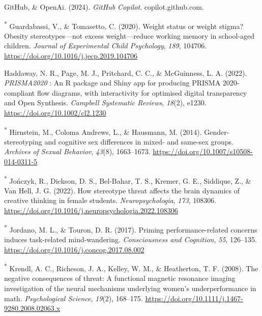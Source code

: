 \documentclass[
  stu,floatsintext]{apa7}
\newlength{\cslhangindent}
\newenvironment{CSLReferences}[2] %
 {\begin{list}{}{%
  \setlength{\itemindent}{0pt}
  \setlength{\leftmargin}{0pt}
  \setlength{\parsep}{0pt}
  \ifodd #1
   \setlength{\leftmargin}{\cslhangindent}
   \setlength{\itemindent}{-1\cslhangindent}
  \fi
  \setlength{\itemsep}{#2\baselineskip}}}
 {\end{list}}
\begin{document}
\begin{CSLReferences}{1}{0}
GitHub, \& OpenAi. (2024). \emph{{GitHub Copilot}}. copilot.github.com.

\textsuperscript{*} Guardabassi, V., \& Tomasetto, C. (2020). Weight status or weight stigma? {Obesity} stereotypes---not excess weight---reduce working memory in school-aged children. \emph{Journal of Experimental Child Psychology}, \emph{189}, 104706. \url{https://doi.org/10.1016/j.jecp.2019.104706}

Haddaway, N. R., Page, M. J., Pritchard, C. C., \& McGuinness, L. A. (2022). {\emph{PRISMA2020}} : {An R} package and {Shiny} app for producing {PRISMA} 2020-compliant flow diagrams, with interactivity for optimised digital transparency and {Open Synthesis}. \emph{Campbell Systematic Reviews}, \emph{18}(2), e1230. \url{https://doi.org/10.1002/cl2.1230}

\textsuperscript{*} Hirnstein, M., Coloma Andrews, L., \& Hausmann, M. (2014). Gender-stereotyping and cognitive sex differences in mixed- and same-sex groups. \emph{Archives of Sexual Behavior}, \emph{43}(8), 1663--1673. \url{https://doi.org/10.1007/s10508-014-0311-5}

\textsuperscript{*} Jończyk, R., Dickson, D. S., Bel-Bahar, T. S., Kremer, G. E., Siddique, Z., \& Van Hell, J. G. (2022). How stereotype threat affects the brain dynamics of creative thinking in female students. \emph{Neuropsychologia}, \emph{173}, 108306. \url{https://doi.org/10.1016/j.neuropsychologia.2022.108306}

\textsuperscript{*} Jordano, M. L., \& Touron, D. R. (2017). Priming performance-related concerns induces task-related mind-wandering. \emph{Consciousness and Cognition}, \emph{55}, 126--135. \url{https://doi.org/10.1016/j.concog.2017.08.002}

\textsuperscript{*} Krendl, A. C., Richeson, J. A., Kelley, W. M., \& Heatherton, T. F. (2008). The negative consequences of threat: A functional magnetic resonance imaging investigation of the neural mechanisms underlying women's underperformance in math. \emph{Psychological Science}, \emph{19}(2), 168--175. \url{https://doi.org/10.1111/j.1467-9280.2008.02063.x}


\end{CSLReferences}
\end{document}

